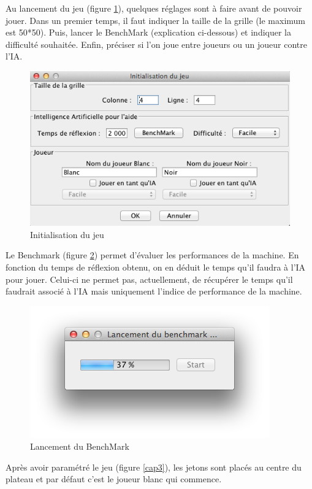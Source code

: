 \documentclass[a4paper,12pt]{report}
\begin{document}
Au lancement du jeu (figure \ref{cap1}), quelques réglages sont à faire avant de pouvoir jouer. Dans un premier temps, il faut indiquer la taille de la grille (le maximum est 50*50). Puis, lancer le BenchMark (explication ci-dessous) et indiquer la difficulté souhaitée. Enfin, préciser si l'on joue entre joueurs ou un joueur contre l'IA. 

\begin{figure}[H]
\centering
\includegraphics[scale=0.6]{Images/initialisation.png}
\caption{Initialisation du jeu}
\label{cap1}
\end{figure}

Le Benchmark (figure \ref{cap2}) permet d'évaluer les performances de la machine. En fonction du temps de réflexion obtenu, on en déduit le temps qu'il faudra à l'IA pour jouer. Celui-ci ne permet pas, actuellement, de récupérer le temps qu'il faudrait associé à l'IA mais uniquement l'indice de performance de la machine. 

\begin{figure}[H]
\centering
\includegraphics[scale=1]{Images/benchmark.png}
\caption{Lancement du BenchMark}
\label{cap2}
\end{figure}

Après avoir paramétré le jeu (figure \ref{cap3}), les jetons sont placés au centre du plateau et par défaut c'est le joueur blanc qui commence. 
\end{document}

